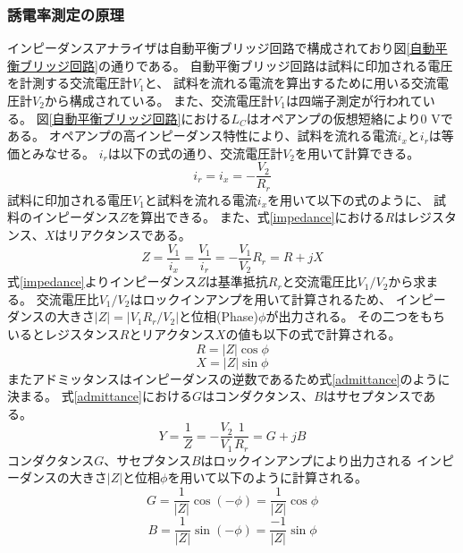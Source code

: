 \documentclass[dvipdfmx,12pt,a4paper]{jreport}
\begin{document}
			\subsubsection{誘電率測定の原理}
			インピーダンスアナライザは自動平衡ブリッジ回路で構成されており図\ref{自動平衡ブリッジ回路}の通りである。
			自動平衡ブリッジ回路は試料に印加される電圧を計測する交流電圧計$V_1$と、
			試料を流れる電流を算出するために用いる交流電圧計$V_2$から構成されている。
			また、交流電圧計$V_1$は四端子測定が行われている。
			図\ref{自動平衡ブリッジ回路}における$L_C$はオペアンプの仮想短絡により0 Vである。
			オペアンプの高インピーダンス特性により、試料を流れる電流$i_x$と$i_r$は等価とみなせる。
			$i_r$は以下の式の通り、交流電圧計$V_2$を用いて計算できる。
			\begin{equation}
				i_r=i_x=-\frac{V_2}{R_r}
			\end{equation}
			試料に印加される電圧$V_1$と試料を流れる電流$i_x$を用いて以下の式のように、
			試料のインピーダンス$Z$を算出できる。
			また、式\eqref{impedance}における$R$はレジスタンス、$X$はリアクタンスである。
			\begin{equation}
				Z=\frac{V_1}{i_x}=\frac{V_1}{i_r}=-\frac{V_1}{V_2}R_r = R + j X  
				\label{impedance}
			\end{equation}
			式\eqref{impedance}よりインピーダンス$Z$は基準抵抗$R_r$と交流電圧比$V_1/V_2$から求まる。
			交流電圧比$V_1/V_2$はロックインアンプを用いて計算されるため、
			インピーダンスの大きさ$|Z|=|V_1 R_r/V_2|$と位相(Phase)$\phi$が出力される。
			その二つをもちいるとレジスタンス$R$とリアクタンス$X$の値も以下の式で計算される。
			\begin{equation}
				R = |Z| \cos \phi
			\end{equation}
			\begin{equation}
				X = |Z| \sin \phi
			\end{equation}
			またアドミッタンスはインピーダンスの逆数であるため式\eqref{admittance}のように決まる。
			式\eqref{admittance}における$G$はコンダクタンス、$B$はサセプタンスである。
			\begin{equation}
				Y= \frac{1}{Z}=-\frac{V_2}{V_1}\frac{1}{R_r} = G + j B
				\label{admittance}
			\end{equation}
			コンダクタンス$G$、サセプタンス$B$はロックインアンプにより出力される
			インピーダンスの大きさ$|Z|$と位相$\phi$を用いて以下のように計算される。
			\begin{equation}
				G = \frac{1}{|Z|} \cos \left(-\phi\right) = \frac{1}{|Z|} \cos \phi
				\label{コンダクタンス}
			\end{equation}
			\begin{equation}
				B = \frac{1}{|Z|} \sin(-\phi) = \frac{-1}{|Z|}\sin \phi
				\label{サセプタンス}
			\end{equation}
\end{document}
